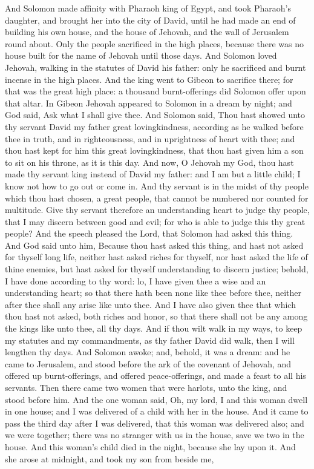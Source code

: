 And Solomon made affinity with Pharaoh king of Egypt, and took Pharaoh’s daughter, and brought her into the city of David, until he had made an end of building his own house, and the house of Jehovah, and the wall of Jerusalem round about. Only the people sacrificed in the high places, because there was no house built for the name of Jehovah until those days. And Solomon loved Jehovah, walking in the statutes of David his father: only he sacrificed and burnt incense in the high places.  And the king went to Gibeon to sacrifice there; for that was the great high place: a thousand burnt-offerings did Solomon offer upon that altar. In Gibeon Jehovah appeared to Solomon in a dream by night; and God said, Ask what I shall give thee. And Solomon said, Thou hast showed unto thy servant David my father great lovingkindness, according as he walked before thee in truth, and in righteousness, and in uprightness of heart with thee; and thou hast kept for him this great lovingkindness, that thou hast given him a son to sit on his throne, as it is this day. And now, O Jehovah my God, thou hast made thy servant king instead of David my father: and I am but a little child; I know not how to go out or come in. And thy servant is in the midst of thy people which thou hast chosen, a great people, that cannot be numbered nor counted for multitude. Give thy servant therefore an understanding heart to judge thy people, that I may discern between good and evil; for who is able to judge this thy great people?  And the speech pleased the Lord, that Solomon had asked this thing. And God said unto him, Because thou hast asked this thing, and hast not asked for thyself long life, neither hast asked riches for thyself, nor hast asked the life of thine enemies, but hast asked for thyself understanding to discern justice; behold, I have done according to thy word: lo, I have given thee a wise and an understanding heart; so that there hath been none like thee before thee, neither after thee shall any arise like unto thee. And I have also given thee that which thou hast not asked, both riches and honor, so that there shall not be any among the kings like unto thee, all thy days. And if thou wilt walk in my ways, to keep my statutes and my commandments, as thy father David did walk, then I will lengthen thy days. And Solomon awoke; and, behold, it was a dream: and he came to Jerusalem, and stood before the ark of the covenant of Jehovah, and offered up burnt-offerings, and offered peace-offerings, and made a feast to all his servants.  Then there came two women that were harlots, unto the king, and stood before him. And the one woman said, Oh, my lord, I and this woman dwell in one house; and I was delivered of a child with her in the house. And it came to pass the third day after I was delivered, that this woman was delivered also; and we were together; there was no stranger with us in the house, save we two in the house. And this woman’s child died in the night, because she lay upon it. And she arose at midnight, and took my son from beside me, 